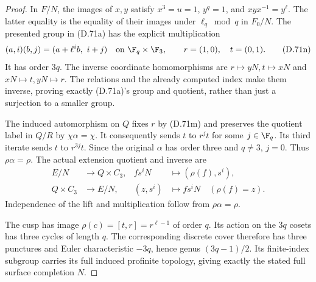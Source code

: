 \begin{proof}
In $F/N$, the images of $x,y$ satisfy
$x^3=u=1$, $y^q=1$, and
$xyx^{-1}=y^\ell$.
The latter equality is the equality of their
images under $\ell_q\bmod q$ in $F_0/N$.
The presented group in (D.71a) has the explicit
multiplication
\[
 (a,i)(b,j)=(a+\ell^ib,\ i+j)
         \quad\text{on }\F_q\times\F_3,
 \qquad r=(1,0),\quad t=(0,1).
                                                               \tag{D.71n}
\]
It has order $3q$.
The inverse coordinate homomorphisms are
$r\mapsto yN,t\mapsto xN$ and
$xN\mapsto t,yN\mapsto r$.
The relations and the already computed index
make them inverse, proving exactly (D.71a)'s
group and quotient, rather than just a
surjection to a smaller group.

The induced automorphism on $Q$ fixes $r$
by (D.71m) and preserves the quotient label
in $Q/R$ by $\chi\alpha=\chi$.
It consequently sends $t$ to $r^jt$ for
some $j\in\F_q$.
Its third iterate sends $t$ to $r^{3j}t$.
Since the original $\alpha$ has order three
and $q\ne3$, $j=0$.
Thus $\rho\alpha=\rho$.
The actual extension quotient and inverse are
\[
 \begin{aligned}
 E/N&\longrightarrow Q\times C_3,
               &fs^iN&\longmapsto(\rho(f),s^i),\\
 Q\times C_3&\longrightarrow E/N,
               &(z,s^i)&\longmapsto fs^iN
                         \quad(\rho(f)=z).
 \end{aligned}                                                \tag{D.71o}
\]
Independence of the lift and multiplication
follow from $\rho\alpha=\rho$.

The cusp has image
$\rho(c)=[t,r]=r^{\ell-1}$ of order $q$.
Its action on the $3q$ cosets has three cycles
of length $q$.
The corresponding discrete cover therefore
has three punctures and Euler characteristic
$-3q$, hence genus $(3q-1)/2$.
Its finite-index subgroup carries its full
induced profinite topology, giving exactly
the stated full surface completion $N$.


\end{proof}
